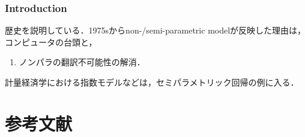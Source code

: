 \documentclass[uplatex,dvipdfmx]{jsreport}
\begin{document}
\subsection{Introduction}

\begin{tcolorbox}[colframe=ForestGreen, colback=ForestGreen!10!white,breakable,colbacktitle=ForestGreen!40!white,coltitle=black,fonttitle=\bfseries\sffamily,
title=]
    歴史を説明している．1975sからnon-/semi-parametric modelが反映した理由は，コンピュータの台頭と，
\end{tcolorbox}

\begin{enumerate}
    \item ノンパラの翻訳不可能性の解消．
\end{enumerate}

\begin{example}
    計量経済学における指数モデルなどは，セミパラメトリック回帰の例に入る．
\end{example}

\chapter{参考文献}
\end{document}
